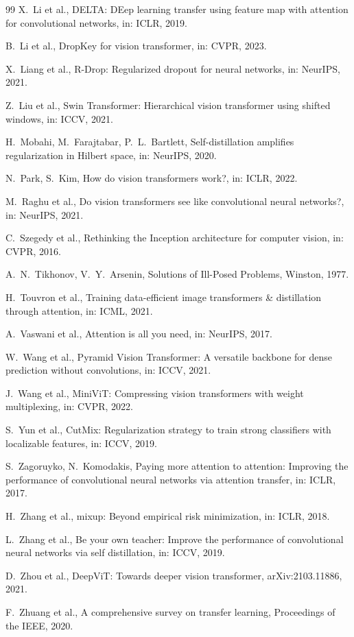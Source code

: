 \documentclass[preprint,12pt]{elsarticle}
\begin{document}
\begin{thebibliography}{99}
 X.~Li et al., DELTA: DEep learning transfer using feature map with attention for convolutional networks, in: ICLR, 2019.

 B.~Li et al., DropKey for vision transformer, in: CVPR, 2023.

 X.~Liang et al., R-Drop: Regularized dropout for neural networks, in: NeurIPS, 2021.

 Z.~Liu et al., Swin Transformer: Hierarchical vision transformer using shifted windows, in: ICCV, 2021.

 H.~Mobahi, M.~Farajtabar, P.~L.~Bartlett, Self-distillation amplifies regularization in Hilbert space, in: NeurIPS, 2020.

 N.~Park, S.~Kim, How do vision transformers work?, in: ICLR, 2022.

 M.~Raghu et al., Do vision transformers see like convolutional neural networks?, in: NeurIPS, 2021.

 C.~Szegedy et al., Rethinking the Inception architecture for computer vision, in: CVPR, 2016.

 A.~N.~Tikhonov, V.~Y.~Arsenin, Solutions of Ill-Posed Problems, Winston, 1977.

 H.~Touvron et al., Training data-efficient image transformers \& distillation through attention, in: ICML, 2021.

 A.~Vaswani et al., Attention is all you need, in: NeurIPS, 2017.

 W.~Wang et al., Pyramid Vision Transformer: A versatile backbone for dense prediction without convolutions, in: ICCV, 2021.

 J.~Wang et al., MiniViT: Compressing vision transformers with weight multiplexing, in: CVPR, 2022.

 S.~Yun et al., CutMix: Regularization strategy to train strong classifiers with localizable features, in: ICCV, 2019.

 S.~Zagoruyko, N.~Komodakis, Paying more attention to attention: Improving the performance of convolutional neural networks via attention transfer, in: ICLR, 2017.

 H.~Zhang et al., mixup: Beyond empirical risk minimization, in: ICLR, 2018.

 L.~Zhang et al., Be your own teacher: Improve the performance of convolutional neural networks via self distillation, in: ICCV, 2019.

 D.~Zhou et al., DeepViT: Towards deeper vision transformer, arXiv:2103.11886, 2021.

 F.~Zhuang et al., A comprehensive survey on transfer learning, Proceedings of the IEEE, 2020.

\end{thebibliography}
\end{document}
